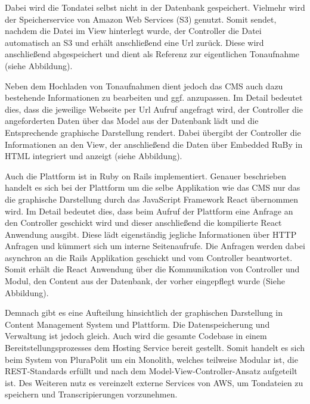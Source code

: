 Dabei wird die Tondatei selbst nicht in der Datenbank gespeichert. Vielmehr wird der Speicherservice von Amazon Web Services (S3) genutzt. Somit sendet, nachdem die Datei im View hinterlegt wurde, der Controller die Datei automatisch an S3 und erhält anschließend eine Url zurück. Diese wird anschließend abgespeichert und dient als Referenz zur eigentlichen Tonaufnahme (siehe Abbildung).

Neben dem Hochladen von Tonaufnahmen dient jedoch das CMS auch dazu bestehende Informationen zu bearbeiten und ggf. anzupassen.
Im Detail bedeutet dies, dass die jeweilige Webseite per Url Aufruf angefragt wird, der Controller die angeforderten Daten über das Model aus der Datenbank lädt und die Entsprechende graphische Darstellung rendert. Dabei übergibt der Controller die Informationen an den View, der anschließend die Daten über Embedded RuBy in HTML integriert und anzeigt (siehe Abbildung).


Auch die Plattform ist in Ruby on Rails implementiert. Genauer beschrieben handelt es sich bei der Plattform um die selbe Applikation wie das CMS nur das die graphische Darstellung durch das JavaScript Framework React übernommen wird. Im Detail bedeutet dies, dass beim Aufruf der Plattform eine Anfrage an den Controller geschickt wird und dieser anschließend die kompilierte React Anwendung ausgibt. Diese lädt eigenständig jegliche Informationen über HTTP Anfragen und kümmert sich um interne Seitenaufrufe. Die Anfragen werden dabei asynchron an die Rails Applikation geschickt und vom Controller beantwortet. Somit erhält die React Anwendung über die Kommunikation von Controller und Modul, den Content aus der Datenbank, der vorher eingepflegt wurde (Siehe Abbildung).

Demnach gibt es eine Aufteilung hinsichtlich der graphischen Darstellung in Content Management System und Plattform. Die Datenspeicherung und Verwaltung ist jedoch gleich. Auch wird die gesamte Codebase in einem Bereitstellungsprozesses dem Hosting Service bereit gestellt. Somit handelt es sich beim System von PluraPolit um ein Monolith, welches teilweise Modular ist, die REST-Standards erfüllt und nach dem Model-View-Controller-Ansatz aufgeteilt ist. Des Weiteren nutz es vereinzelt externe Services von AWS, um Tondateien zu speichern und Transcripierungen vorzunehmen.

